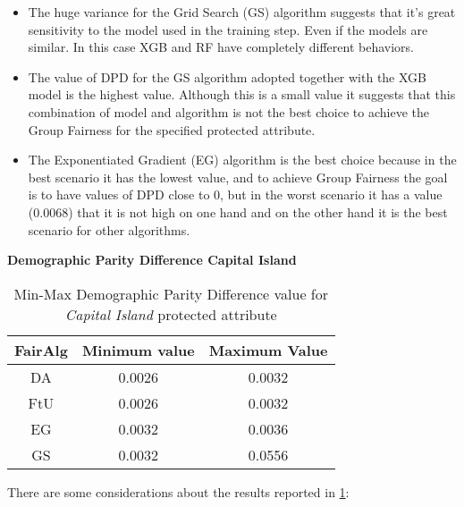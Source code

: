 \begin{itemize}
    \item The huge variance for the Grid Search (GS) algorithm suggests that it's great sensitivity to the model used in the training step. Even if the models are similar. In this case XGB and RF have completely different behaviors.

    \item The value of DPD for the GS algorithm adopted together with the XGB model is the highest value. Although this is a small value it suggests that this combination of model and algorithm is not the best choice to achieve the Group Fairness for the specified protected attribute.

    \item The Exponentiated Gradient (EG) algorithm is the best choice because in the best scenario it has the lowest value, and to achieve Group Fairness the goal is to have values of DPD close to 0, but in the worst scenario it has a value (0.0068) that it is not high on one hand and on the other hand it is the best scenario for other algorithms.

\end{itemize}


\newpage
\textbf{Demographic Parity Difference Capital Island}
\begin{table}
    \centering
    \begin{tabular}{|c|c|c|}
        \hline
        \textbf{FairAlg} & \textbf{Minimum value} & \textbf{Maximum Value} \\
        \hline
        DA & 0.0026 & 0.0032 \\
        \hline
        FtU & 0.0026 & 0.0032 \\
        \hline
        EG & 0.0032 & 0.0036 \\
        \hline
        GS & 0.0032 & 0.0556 \\
        \hline
    \end{tabular}
    \caption{Min-Max Demographic Parity Difference value for \emph{Capital Island} protected attribute}
    \label{tab:ci_dpd}
\end{table}

There are some considerations about the results reported in \cref{tab:ci_dpd}:

